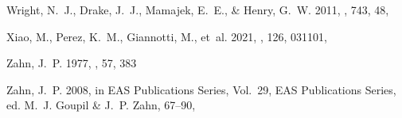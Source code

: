 \documentclass[twocolumn]{aastex631}
\begin{document}
\begin{thebibliography}{}
{Wright}, N.~J., {Drake}, J.~J., {Mamajek}, E.~E., \& {Henry}, G.~W. 2011,
  \apj, 743, 48, 

{Xiao}, M., {Perez}, K.~M., {Giannotti}, M., {et~al.} 2021, \prl, 126, 031101,

{Zahn}, J.~P. 1977, \aap, 57, 383

{Zahn}, J.~P. 2008, in EAS Publications Series, Vol.~29, EAS Publications
  Series, ed. M.~J. {Goupil} \& J.~P. {Zahn}, 67--90,

\end{thebibliography}
\end{document}
